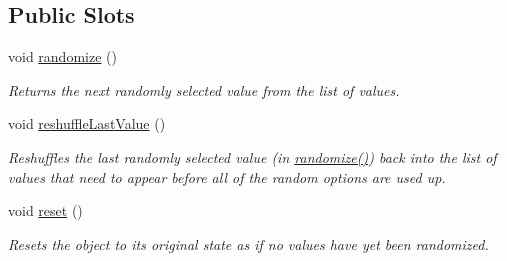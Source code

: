 \subsection*{Public Slots}
\begin{DoxyCompactItemize}
\item 
void \hyperlink{class_picto_1_1_pseudorandom_int_parameter_a77d69b74839fc19dd17b3b01b348a2c0}{randomize} ()
\begin{DoxyCompactList}\small\item\em Returns the next randomly selected value from the list of values. \end{DoxyCompactList}\item 
void \hyperlink{class_picto_1_1_pseudorandom_int_parameter_a299104e7f698fc7058bb368f91d3025e}{reshuffle\-Last\-Value} ()
\begin{DoxyCompactList}\small\item\em Reshuffles the last randomly selected value (in \hyperlink{class_picto_1_1_pseudorandom_int_parameter_a77d69b74839fc19dd17b3b01b348a2c0}{randomize()}) back into the list of values that need to appear before all of the random options are used up. \end{DoxyCompactList}\item 
void \hyperlink{class_picto_1_1_pseudorandom_int_parameter_a8859332176ab5ed8ab70157a87ab74e2}{reset} ()
\begin{DoxyCompactList}\small\item\em Resets the object to its original state as if no values have yet been randomized. \end{DoxyCompactList}\end{DoxyCompactItemize}
